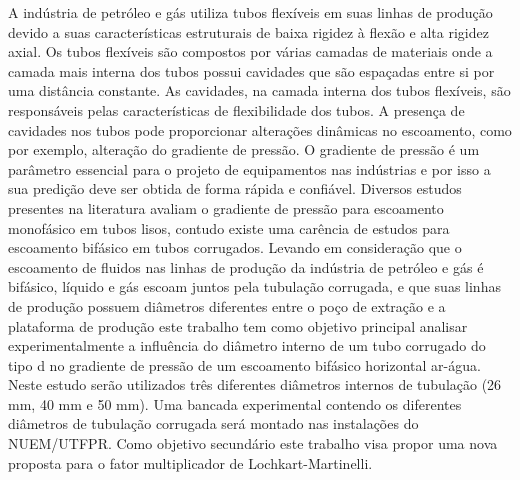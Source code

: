  
A indústria de petróleo e gás utiliza tubos flexíveis em suas linhas de produção devido a 
suas características estruturais de baixa rigidez à flexão e alta rigidez axial.
Os tubos flexíveis são compostos por várias camadas de materiais onde a 
camada mais interna dos tubos possui cavidades que são espaçadas entre si por uma distância constante.
As cavidades, na camada interna dos tubos flexíveis, são responsáveis pelas
características de flexibilidade dos tubos. A presença de cavidades nos tubos pode proporcionar alterações dinâmicas no
escoamento, como por exemplo, alteração do gradiente de pressão. O gradiente de pressão é um parâmetro essencial para o projeto de equipamentos
nas indústrias e por isso a sua predição deve ser obtida de forma rápida e confiável. Diversos estudos presentes na literatura avaliam o 
gradiente de pressão para escoamento monofásico em tubos lisos, contudo existe uma carência de estudos para escoamento bifásico em tubos corrugados.  
Levando em consideração que o escoamento de fluidos nas linhas de produção da indústria de petróleo e gás é bifásico,
líquido e gás escoam juntos pela tubulação corrugada,
e que suas linhas de produção possuem diâmetros diferentes entre o poço de extração e a plataforma de 
produção este trabalho tem como objetivo principal analisar experimentalmente a influência do diâmetro interno de um tubo corrugado do tipo d no gradiente de
pressão de um escoamento bifásico horizontal ar-água. Neste estudo serão utilizados três diferentes diâmetros internos de tubulação
(26 mm, 40 mm e 50 mm). Uma bancada experimental contendo os diferentes diâmetros de tubulação corrugada será montado nas instalações do NUEM/UTFPR. 
Como objetivo secundário este trabalho visa propor uma nova proposta para o fator multiplicador de Lochkart-Martinelli.










